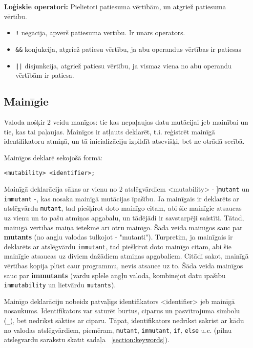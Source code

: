 \documentclass[12pt,a4paper]{report}
\begin{document}
\textbf{Loģiskie operatori:} Pielietoti patiesuma vērtībām, un atgriež patiesuma vērtību.
\begin{itemize}
  \item \texttt{!} nēgācija, apvērš patiesuma vērtību. Ir unārs operators. 
  \item \texttt{\&\&} konjukcija, atgriež patiesu vērtību, ja abu operandus vērtības ir patiesas
  \item \texttt{||} disjunkcija, atgriež patiesu vērtību, ja vismaz viena no abu operandu vērtībām ir patiesa.
\end{itemize}

\subsection{Mainīgie}
\label{section:vars}

Valoda nošķir 2 veidu manīgos: tie kas nepaļaujas datu mutācijai jeb mainībai un tie, kas tai paļaujas. Mainīgos ir atļauts deklarēt, t.i. reģistrēt mainīgā identifikatoru atmiņā, un tā inicializāciju izpildīt atsevišķi, bet ne otrādā secībā.

Mainīgos deklarē sekojošā formā:
\begin{verbatim}
<mutability> <identifier>;
\end{verbatim}

Mainīgā deklarācija sākas ar vienu no 2 atslēgvārdiem <mutability> - ]\texttt{mutant} un \texttt{immutant} -, kas nosaka mainīgā mutācijas īpašību. Ja mainīgais ir deklarēts ar atslēgvārdu \texttt{mutant}, tad piešķirot doto mainīgo citam, abi šie mainīgie atsaucas uz vienu un to pašu atmiņas apgabalu, un tādējādi ir savstarpēji saistīti. Tātad, mainīgā vērtības maiņa ietekmē arī otru mainīgo. Šāda veida mainīgos sauc par \textbf{mutants} (no angļu valodas tulkojot - "mutanti").
Turpretim, ja mainīgais ir deklarēts ar atslēgvārdu \texttt{immutant}, tad piešķirot doto mainīgo citam, abi šie mainīgie atsaucas uz diviem dažādiem atmiņas apgabaliem. Citādi sakot, mainīgā vērtības kopija plūst caur programmu, nevis atsauce uz to. Šāda veida mainīgos sauc par \textbf{immutants} (vārdu splēle angļu valodā, kombinējot datu īpašību \texttt{immutability} un lietvārdu \texttt{mutants}).

Mainīgo deklarāciju nobeidz patvaļīgs identifikators <identifier> jeb mainīgā nosaukums. Identifikators var saturēt burtus, ciparus un pasvītrojuma simbolu (\texttt{\_}), bet nedrīkst sākties ar ciparu. Tāpat, identifikators nedrīkst sakrist ar kādu no valodas atslēgvārdiem, piemēram, \texttt{mutant}, \texttt{immutant}, \texttt{if}, \texttt{else} u.c. (pilnu atslēgvārdu sarakstu skatīt sadaļā ~\ref{section:keywords}).
\end{document}
